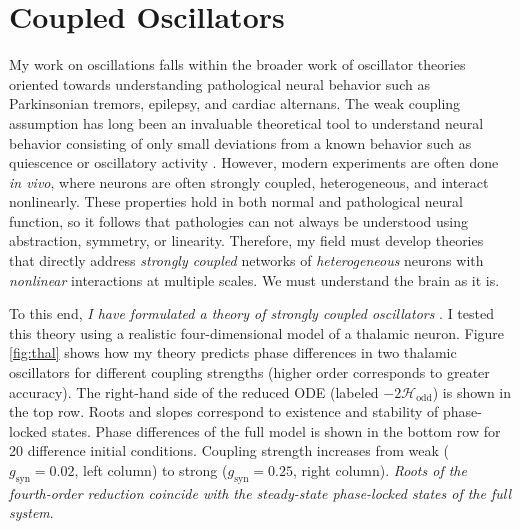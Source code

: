 \documentclass[a4paper,11pt]{article}
\newcommand{\h}{\mathcal{H}}
\begin{document}
\section{Coupled Oscillators}\label{sec:interactions}

My work on oscillations falls within the broader work of oscillator theories oriented towards understanding pathological neural behavior such as Parkinsonian tremors, epilepsy, and cardiac alternans. The weak coupling assumption has long been an invaluable theoretical tool to understand neural behavior consisting of only small deviations from a known behavior such as quiescence or oscillatory activity \cite{ermentrout2002modeling,park2016weakly,park2018multiple,park2018scalar}. However, modern experiments are often done \textit{in vivo}, where neurons are often strongly coupled, heterogeneous, and interact nonlinearly. These properties hold in both normal and pathological neural function, so it follows that pathologies can not always be understood using abstraction, symmetry, or linearity. Therefore, my field must develop theories that directly address \textit{strongly coupled} networks of \textit{heterogeneous} neurons with \textit{nonlinear} interactions at multiple scales. We must understand the brain as it is.

To this end, \textit{I have formulated a theory of strongly coupled oscillators} \cite{park2020high}. I tested this theory using a realistic four-dimensional model of a thalamic neuron. Figure \ref{fig:thal} shows how my theory predicts phase differences in two thalamic oscillators for different coupling strengths (higher order corresponds to greater accuracy). The right-hand side of the reduced ODE (labeled $-2\h_{\text{odd}}$) is shown in the top row. Roots and slopes correspond to existence and stability of phase-locked states. Phase differences of the full model is shown in the bottom row for 20 difference initial conditions. Coupling strength increases from weak ($g_\text{syn}=0.02$, left column) to strong ($g_\text{syn}=0.25$, right column). \textit{Roots of the fourth-order reduction coincide with the steady-state phase-locked states of the full system}.
\end{document}

